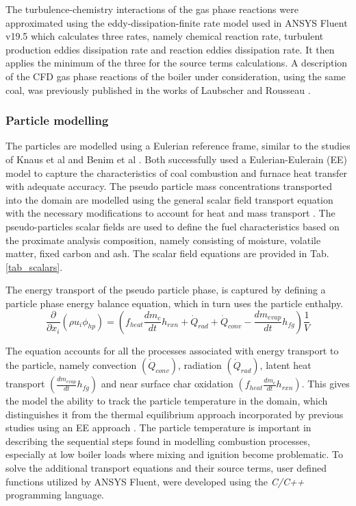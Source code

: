 \documentclass[11pt,cleanfoot]{asme2ej}
\begin{document}
The turbulence-chemistry interactions of the gas phase reactions were approximated using the eddy-dissipation-finite rate model used in ANSYS Fluent v19.5\textsuperscript{\textregistered} which calculates three rates, namely chemical reaction rate, turbulent production eddies dissipation rate and reaction eddies dissipation rate. It then applies the minimum of the three for the source terms calculations. A description of the CFD gas phase reactions of the boiler under consideration, using the same coal, was previously published in the works of Laubscher and Rousseau \cite{Laubscher2019b}.

\subsubsection{Particle modelling}
The particles are modelled using a Eulerian reference frame, similar to the studies of Knaus et al \cite{Knaus2001a} and Benim et al \cite{Benim2005}. Both successfully used a Eulerian-Eulerain (EE) model to capture the characteristics of coal combustion and furnace heat transfer with adequate accuracy. The pseudo particle mass concentrations transported into the domain are modelled using the general scalar field transport equation with the necessary modifications to account for heat and mass transport \cite{Versteeg2007}. The pseudo-particles scalar fields are used to define the fuel characteristics based on the proximate analysis composition, namely consisting of moisture, volatile matter, fixed carbon and ash. The scalar field equations are provided in Tab. \ref{tab_scalars}.

The energy transport of the pseudo particle phase, is captured by defining a particle phase energy balance equation, which in turn uses the particle enthalpy.
\begin{equation}\label{eqn_phi_hp}
\frac{\partial}{\partial x_{i}}( \rho u_{i} \phi_{hp} )=( f_{heat}\frac{dm_{c}}{dt}h_{rxn} + \dot{Q}_{rad} + \dot{Q}_{conv} -\frac{dm_{evap}}{dt}h_{fg}) \frac{1}{V} 
\end{equation}

The equation accounts for all the processes associated with energy transport to the particle, namely convection $\left(\dot{Q}_{conv}\right)$, radiation $\left(\dot{Q}_{rad}\right)$, latent heat transport $\left(\frac{dm_{evap}}{dt}h_{fg}\right)$ and near surface char oxidation $\left(f_{heat}\frac{dm_{c}}{dt}h_{rxn}\right)$. This gives the model the ability to track the particle temperature in the domain, which distinguishes it from the thermal equilibrium approach incorporated by previous studies using an EE approach \cite{Benim2005, Vicente2003, Cai2015}. The particle temperature is important in describing the sequential steps found in modelling combustion processes, especially at low boiler loads where mixing and ignition become problematic. To solve the additional transport equations and their source terms, user defined functions utilized by ANSYS Fluent, were developed using the \textit{C/C++} programming language.
\end{document}

